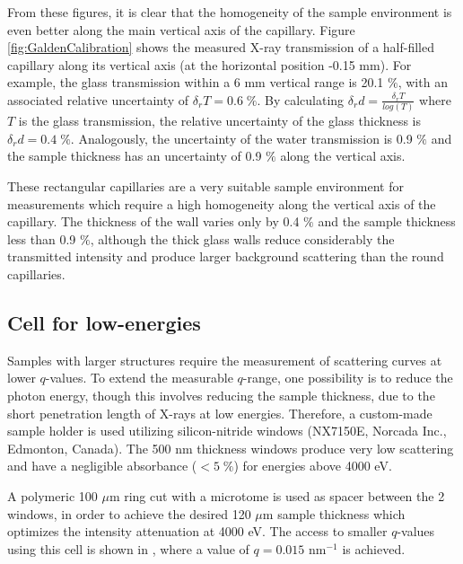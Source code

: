 From these figures, it is clear that the homogeneity of the sample environment is even better along the main vertical axis of the capillary. Figure \ref{fig:GaldenCalibration} shows the measured X-ray transmission of a half-filled capillary along its vertical axis (at the horizontal position -0.15 mm). For example, the glass transmission within a 6 mm vertical range is 20.1 $\%$, with an associated relative uncertainty of $\delta_r T =0.6 \; \%$. By calculating $\delta_r d = \frac{\delta_r T}{log(T)}$ where $T$ is the glass transmission, the relative uncertainty of the glass thickness is $\delta_r d = 0.4 \; \%$. Analogously, the uncertainty of the water transmission is 0.9 $\%$ and the sample thickness has an uncertainty of 0.9 $\%$ along the vertical axis.

These rectangular capillaries are a very suitable sample environment for measurements which require a high homogeneity along the vertical axis of the capillary. The thickness of the wall varies only by 0.4 $\%$ and the sample thickness less than 0.9 $\%$, although the thick glass walls reduce considerably the transmitted intensity and produce larger background scattering than the round capillaries.

\subsection{Cell for low-energies}

Samples with larger structures require the measurement of scattering curves at lower $q$-values. To extend the measurable $q$-range, one possibility is to reduce the photon energy, though this involves reducing the sample thickness, due to the short penetration length of X-rays at low energies. Therefore, a custom-made sample holder is used utilizing silicon-nitride windows (NX7150E, Norcada Inc., Edmonton, Canada). The 500 nm thickness windows produce very low scattering and have a negligible absorbance ($<5\;\%$) for energies above 4000 eV.

A polymeric 100 $\mu$m ring cut with a microtome is used as spacer between the 2 windows, in order to achieve the desired 120 $\mu$m sample thickness which optimizes the intensity attenuation at 4000 eV. The access to smaller $q$-values using this cell is shown in \cite{varga_towards_2014}, where a value of $q=0.015$ nm$^{-1}$ is achieved.

